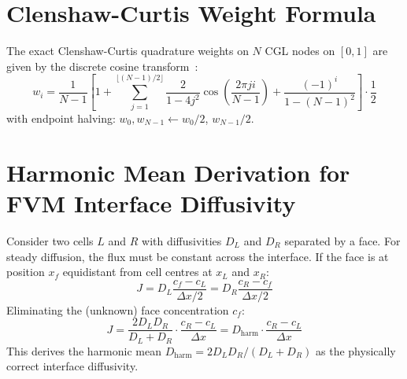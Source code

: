\section{Clenshaw-Curtis Weight Formula}

The exact Clenshaw-Curtis quadrature weights on $N$ CGL nodes on $[0,1]$ are given by the discrete cosine transform~\cite{Waldvogel2006}:
\begin{equation}
  w_i = \frac{1}{N-1}\left[1 + \sum_{j=1}^{\lfloor(N-1)/2\rfloor} \frac{2}{1-4j^2}\cos\!\left(\frac{2\pi j i}{N-1}\right) + \frac{(-1)^i}{1-(N-1)^2}\right] \cdot \frac{1}{2}
\end{equation}
with endpoint halving: $w_0, w_{N-1} \leftarrow w_0/2$, $w_{N-1}/2$.

\section{Harmonic Mean Derivation for FVM Interface Diffusivity}

Consider two cells $L$ and $R$ with diffusivities $D_L$ and $D_R$ separated by a face. For steady diffusion, the flux must be constant across the interface. If the face is at position $x_f$ equidistant from cell centres at $x_L$ and $x_R$:
\begin{equation}
  J = D_L \frac{c_f - c_L}{\Delta x/2} = D_R \frac{c_R - c_f}{\Delta x/2}
\end{equation}
Eliminating the (unknown) face concentration $c_f$:
\begin{equation}
  J = \frac{2 D_L D_R}{D_L + D_R} \cdot \frac{c_R - c_L}{\Delta x} = D_\text{harm} \cdot \frac{c_R - c_L}{\Delta x}
\end{equation}
This derives the harmonic mean $D_\text{harm} = 2D_L D_R/(D_L + D_R)$ as the physically correct interface diffusivity.
